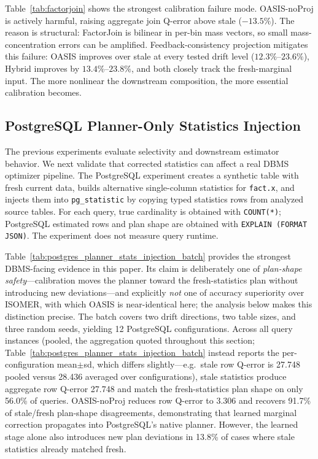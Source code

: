 \documentclass[preprint,12pt]{elsarticle}
\newcommand{\oasisUseMaxWidthResize}[1]{%
  \renewcommand{\resizebox}[3]{\adjustbox{max width=#1}{##3}}%
}
\begin{document}
\begingroup
\renewcommand{\small}{\scriptsize}

\endgroup

Table~\ref{tab:factorjoin} shows the strongest calibration failure mode.
OASIS-noProj is actively harmful, raising aggregate join Q-error above stale
($-13.5\%$). The reason is structural: FactorJoin is bilinear in per-bin mass
vectors, so small mass-concentration errors can be amplified.
Feedback-consistency projection mitigates this failure:
OASIS improves over stale at every tested drift level ($12.3\%$--$23.6\%$),
Hybrid improves by $13.4\%$--$23.8\%$, and both closely track the fresh-marginal
input. The more nonlinear the downstream composition, the more essential
calibration becomes.

\subsection{PostgreSQL Planner-Only Statistics Injection}
\label{sec:postgres-planner}

The previous experiments evaluate selectivity and downstream estimator
behavior. We next validate that corrected statistics can affect a real DBMS
optimizer pipeline. The PostgreSQL experiment creates a synthetic table with
fresh current data, builds alternative single-column statistics for
\texttt{fact.x}, and injects them into \texttt{pg\_statistic} by copying typed
statistics rows from analyzed source tables. For each query, true cardinality
is obtained with \texttt{COUNT(*)}; PostgreSQL estimated rows and plan shape are
obtained with \texttt{EXPLAIN (FORMAT JSON)}. The experiment does not measure
query runtime.

\begingroup
\oasisUseMaxWidthResize{.88\columnwidth}

\endgroup

Table~\ref{tab:postgres_planner_stats_injection_batch} provides the strongest
DBMS-facing evidence in this paper. Its claim is deliberately one of
\emph{plan-shape safety}---calibration moves the planner toward the
fresh-statistics plan without introducing new deviations---and explicitly
\emph{not} one of accuracy superiority over ISOMER, with which OASIS is
near-identical here; the analysis below makes this distinction precise. The
batch covers two drift directions,
two table sizes, and three random seeds, yielding 12 PostgreSQL configurations.
Across all query instances (pooled, the aggregation quoted throughout this
section; Table~\ref{tab:postgres_planner_stats_injection_batch} instead reports
the per-configuration mean$\pm$sd, which differs slightly---e.g.\ stale row
Q-error is 27.748 pooled versus 28.436 averaged over configurations), stale
statistics produce aggregate row Q-error 27.748 and match the fresh-statistics
plan shape on only 56.0\% of queries.
OASIS-noProj reduces row Q-error to 3.306 and recovers 91.7\% of stale/fresh
plan-shape disagreements, demonstrating that learned marginal correction
propagates into PostgreSQL's native planner. However, the learned stage alone
also introduces new plan deviations in 13.8\% of cases where stale statistics
already matched fresh.
\end{document}
